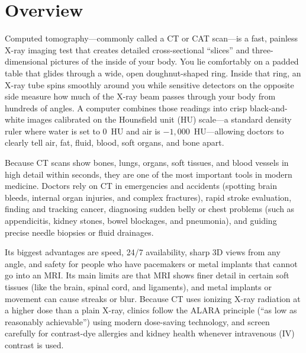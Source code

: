 \label{ch:infographic-ctscan}

\section{Overview}

Computed tomography---commonly called a CT or CAT scan---is a fast, painless X-ray imaging test that creates detailed cross-sectional ``slices'' and three-dimensional pictures of the inside of your body. You lie comfortably on a padded table that glides through a wide, open doughnut-shaped ring. Inside that ring, an X-ray tube spins smoothly around you while sensitive detectors on the opposite side measure how much of the X-ray beam passes through your body from hundreds of angles. A computer combines those readings into crisp black-and-white images calibrated on the Hounsfield unit (HU) scale---a standard density ruler where water is set to 0~HU and air is $-1,000$~HU---allowing doctors to clearly tell air, fat, fluid, blood, soft organs, and bone apart.

Because CT scans show bones, lungs, organs, soft tissues, and blood vessels in high detail within seconds, they are one of the most important tools in modern medicine. Doctors rely on CT in emergencies and accidents (spotting brain bleeds, internal organ injuries, and complex fractures), rapid stroke evaluation, finding and tracking cancer, diagnosing sudden belly or chest problems (such as appendicitis, kidney stones, bowel blockages, and pneumonia), and guiding precise needle biopsies or fluid drainages.

Its biggest advantages are speed, 24/7 availability, sharp 3D views from any angle, and safety for people who have pacemakers or metal implants that cannot go into an MRI. Its main limits are that MRI shows finer detail in certain soft tissues (like the brain, spinal cord, and ligaments), and metal implants or movement can cause streaks or blur. Because CT uses ionizing X-ray radiation at a higher dose than a plain X-ray, clinics follow the ALARA principle (``as low as reasonably achievable'') using modern dose-saving technology, and screen carefully for contrast-dye allergies and kidney health whenever intravenous (IV) contrast is used.

